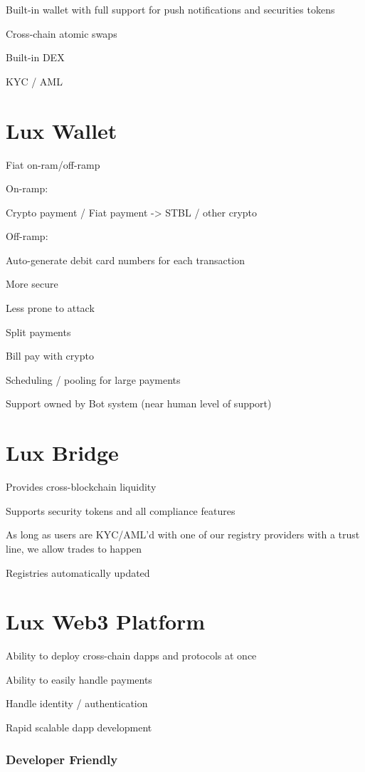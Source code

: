 \documentclass[11pt]{article}
\begin{document}
Built-in wallet with full support for push notifications and securities tokens


Cross-chain atomic swaps


Built-in DEX


KYC / AML


\section{Lux Wallet}

Fiat on-ram/off-ramp


On-ramp:


Crypto payment / Fiat payment -> STBL / other crypto


Off-ramp:


Auto-generate debit card numbers for each transaction


More secure


Less prone to attack


Split payments


Bill pay with crypto


Scheduling / pooling for large payments


Support owned by Bot system (near human level of support)


\section{Lux Bridge}

Provides cross-blockchain liquidity


Supports security tokens and all compliance features


As long as users are KYC/AML'd with one of our registry providers with a trust line, we allow trades to happen


Registries automatically updated


\section{Lux Web3 Platform}

Ability to deploy cross-chain dapps and protocols at once


Ability to easily handle payments


Handle identity / authentication


Rapid scalable dapp development


\subsubsection{Developer Friendly}
\end{document}
